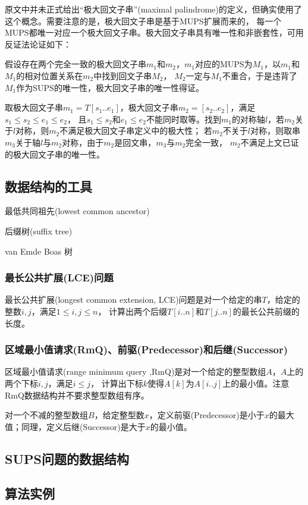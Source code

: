 原文中并未正式给出“极大回文子串”(maximal palindrome)的定义，但确实使用了这个概念。需要注意的是，极大回文子串是基于MUPS扩展而来的，
每一个MUPS都唯一对应一个极大回文子串。极大回文子串具有唯一性和非嵌套性，可用反证法论证如下：

假设存在两个完全一致的极大回文子串$m_1$和$m_2$，$m_1$对应的MUPS为$M_1$，以$m_1$和$M_1$的相对位置关系在$m_2$中找到回文子串$M_2$，
$M_2$一定与$M_1$不重合，于是违背了$M_1$作为SUPS的唯一性，极大回文子串的唯一性得证。

取极大回文子串$m_1 = T[s_1..e_1]$，极大回文子串$m_2 = [s_2..e_2]$，满足$s_1 \leq s_2 \leq e_1 \leq e_2 $，
且$s_1 \leq s_2$和$e_1 \leq e_2$不能同时取等。找到$m_1$的对称轴$l$，若$m_2$关于$l$对称，则$m_2$不满足极大回文子串定义中的极大性；
若$m_2$不关于$l$对称，则取串$m_3$关于轴$l$与$m_2$对称，由于$m_2$是回文串，$m_3$与$m_2$完全一致，
$m_2$不满足上文已证的极大回文子串的唯一性。

\subsection{数据结构的工具}\label{subsec:tools}

最低共同祖先(lowest common ancestor)

后缀树(suffix tree)

van Emde Boas 树

\subsubsection{最长公共扩展(LCE)问题}\label{subsubsec:lce}

最长公共扩展(longest common extension, LCE)问题是对一个给定的串$T$，给定的整数$i,j$，满足$1 \leq i,j \leq n$，
计算出两个后缀$T[i..n]$和$T[j..n]$的最长公共前缀的长度。

\subsubsection{区域最小值请求(RmQ)、前驱(Predecessor)和后继(Successor)}\label{subsubsec:rmq}

区域最小值请求(range minimum query ,RmQ)是对一个给定的整型数组$A$，$A$上的两个下标$i,j$，满足$i \leq j$，
计算出下标$k$使得$A[k]$为$A[i..j]$上的最小值。注意RmQ数据结构并不要求整型数组有序。

对一个不减的整型数组$B$，给定整型数$x$，定义前驱(Predecessor)是小于$x$的最大值；同理，定义后继(Successor)是大于$x$的最小值。

\subsection{SUPS问题的数据结构}\label{subsec:sups}

\subsection{算法实例}\label{subsec:eg}

